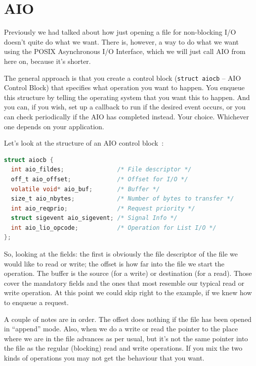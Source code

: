 \documentclass[a4paper]{report}
\begin{document}

\section*{AIO}
Previously we had talked about how just opening a file for non-blocking I/O doesn't quite do what we want. There is, however, a way to do what we want using the POSIX Asynchronous I/O Interface, which we will just call AIO from here on, because it's shorter.

The general approach is that you create a control block (\texttt{struct aiocb} -- AIO Control Block) that specifies what operation you want to happen. You enqueue this structure by telling the operating system that you want this to happen. And you can, if you wish, set up a callback to run if the desired event occurs, or you can check periodically if the AIO has completed instead. Your choice. Whichever one depends on your application.

Let's look at the structure of an AIO control block~\cite{apunix}:
\begin{lstlisting}[language=C]
struct aiocb {
  int aio_fildes;               /* File descriptor */
  off_t aio_offset;             /* Offset for I/O */
  volatile void* aio_buf;       /* Buffer */
  size_t aio_nbytes;            /* Number of bytes to transfer */
  int aio_reqprio;              /* Request priority */
  struct sigevent aio_sigevent; /* Signal Info */
  int aio_lio_opcode;           /* Operation for List I/O */
};
\end{lstlisting}

So, looking at the fields: the first is obviously the file descriptor of the file we would like to read or write; the offset is how far into the file we start the operation. The buffer is the source (for a write) or destination (for a read). Those cover the mandatory fields and the ones that most resemble our typical read or write operation. At this point we could skip right to the example, if we knew how to enqueue a request.

A couple of notes are in order. The offset does nothing if the file has been opened in ``append'' mode. Also, when we do a write or read the pointer to the place where we are in the file advances as per usual, but it's not the same pointer into the file as the regular (blocking) read and write operations. If you mix the two kinds of operations you may not get the behaviour that you want.
\end{document}
